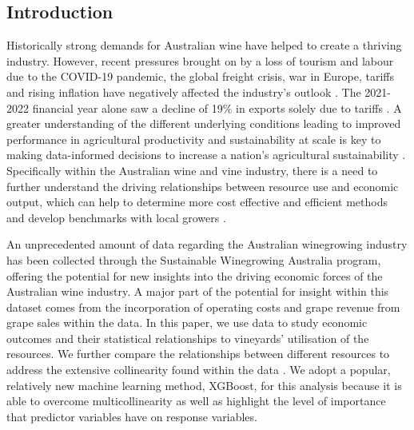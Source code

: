 \documentclass[review,12pt,authoryear]{elsarticle}
\begin{document}
\begin{linenumbers}





\section{Introduction}

Historically strong demands for Australian wine have helped to create a thriving industry. However, recent pressures brought on by a loss of tourism and labour due to the COVID-19 pandemic, the global freight crisis, war in Europe, tariffs and rising inflation have negatively affected the industry's outlook \citep{wineaustraliaNationalVintageReport2021,wineaustraliaAustralianWineProduction2021}. The 2021-2022 financial year alone saw a decline of 19\% in exports solely due to tariffs \citep{wineaustraliaNationalVintageReport2022}. A greater understanding of the different underlying conditions leading to improved performance in agricultural productivity and sustainability at scale is key to making data-informed decisions to increase a nation's agricultural sustainability \citep{oecdInnovationProductivitySustainability2019}. Specifically within the Australian wine and vine industry, there is a need to further understand the driving relationships between resource use and economic output, which can help to determine more cost effective and efficient methods and develop benchmarks with local growers \citep{lukemanciniUnderstandingAustralianWine2020}.
\par
An unprecedented amount of data regarding the Australian winegrowing industry has been collected through the Sustainable Winegrowing Australia program, offering the potential for new insights into the driving economic forces of the Australian wine industry. A major part of the potential for insight within this dataset comes from the incorporation of operating costs and grape revenue from grape sales within the data. In this paper, we use data to study economic outcomes and their statistical relationships to vineyards' utilisation of the resources. We further compare the relationships between different resources to address the extensive collinearity found within the data \citep{chenXGBoostScalableTree2016}. We adopt  a popular, relatively new machine learning method, XGBoost, for this analysis because it is able to overcome multicollinearity as well as highlight the level of importance that predictor variables have on response variables.


\end{linenumbers}
\end{document}
